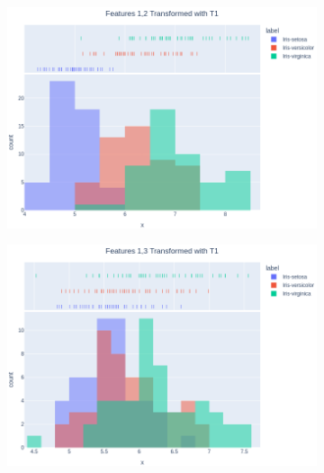 \documentclass[14pt,a4]{article}
\begin{document}
\begin{figure}[h]
    \centering
    \begin{subfigure}{0.32\linewidth}
        \centering
        \includegraphics[width=\linewidth]{images/q3/p2/12T1.png}
    \end{subfigure}
    \hfill
    \begin{subfigure}{0.32\linewidth}
        \centering
        \includegraphics[width=\linewidth]{images/q3/p2/13T1.png}
    \end{subfigure}
    \hfill
    \begin{subfigure}{0.32\linewidth}
        \centering

\end{subfigure}
\end{figure}
\end{document}

